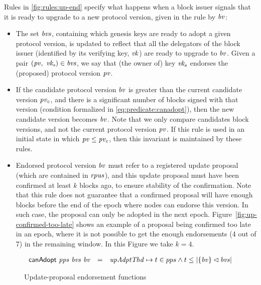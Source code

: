 Rules in \cref{fig:rules:up-end} specify what happens when a block issuer
signals that it is ready to upgrade to a new protocol version, given in the
rule by $\mathit{bv}$:
\begin{itemize}
\item The set $\mathit{bvs}$, containing which genesis keys are ready to adopt a
  given protocol version, is updated to reflect that all the delegators of the
  block issuer (identified by its verifying key, $\mathit{vk}$) are ready to
  upgrade to $\mathit{bv}$. Given a pair $(\mathit{pv}, ~\mathit{vk_s}) \in \mathit{bvs}$,
  we say that (the owner of) key $\mathit{vk_s}$ endorses the (proposed) protocol
  version $\mathit{pv}$.
\item If the candidate protocol version $\mathit{bv}$ is greater than the current
  candidate version $\mathit{pv_c}$, and there is a significant number of blocks
  signed with that version (condition formalized in
  \cref{eq:predicate:canadopt}), then the new candidate version becomes
  $\mathit{bv}$. Note that we only compare candidates block versions, and not the
  current protocol version $\mathit{pv}$. If this rule is used in an initial state
  in which $\mathit{pv} \leq \mathit{pv_c}$, then this invariant is maintained by
  these rules.
\item Endorsed protocol version $\mathit{bv}$ must refer to a registered update
  proposal (which are contained in $\mathit{rpus}$), and this update proposal must
  have been confirmed at least $k$ blocks ago, to ensure stability of the
  confirmation. Note that this rule does not guarantee that a confirmed
  proposal will have enough blocks before the end of the epoch where nodes can
  endorse this version. In such case, the proposal can only be adopted in the
  next epoch. Figure~\ref{fig:up-confirmed-too-late} shows an example of a
  proposal being confirmed too late in an epoch, where it is not possible to
  get the enough endorsements (4 out of 7) in the remaining window. In this
  Figure we take $k = 4$.
\end{itemize}

\begin{figure}[htb]
  \begin{equation}
    \label{eq:predicate:canadopt}
    \begin{array}{r c l}
      \mathsf{canAdopt}~\mathit{pps}~\mathit{bvs}~\mathit{bv}
      & =
      & \mathit{upAdptThd} \mapsto t \in pps \wedge
        t \leq \left| \{\mathit{bv}\} \lhd \mathit{bvs} \right|\\
    \end{array}
  \end{equation}
  \caption{Update-proposal endorsement functions}
\end{figure}

